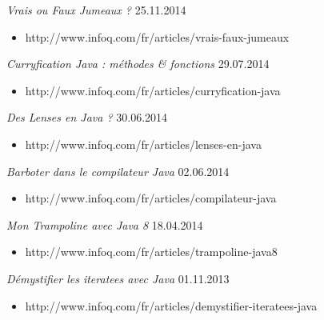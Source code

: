 \documentclass{res}
\begin{document}
\begin{resume}
{\sl Vrais ou Faux Jumeaux ?}  \hfill    25.11.2014 \\
\begin{itemize} %
 \item[] http://www.infoq.com/fr/articles/vrais-faux-jumeaux
\end{itemize}

{\sl Curryfication Java : méthodes & fonctions}  \hfill    29.07.2014 \\
\begin{itemize} %
 \item[] http://www.infoq.com/fr/articles/curryfication-java
\end{itemize}


{\sl Des Lenses en Java ?}  \hfill    30.06.2014	\\
\begin{itemize} %
 \item[] http://www.infoq.com/fr/articles/lenses-en-java
\end{itemize}

{\sl Barboter dans le compilateur Java}  \hfill    02.06.2014	\\
\begin{itemize} %
 \item[] http://www.infoq.com/fr/articles/compilateur-java
\end{itemize}

{\sl Mon Trampoline avec Java 8}  \hfill    18.04.2014	\\
\begin{itemize} %
 \item[] http://www.infoq.com/fr/articles/trampoline-java8
\end{itemize}

{\sl Démystifier les iteratees avec Java}  \hfill    01.11.2013	\\
\begin{itemize} %
 \item[] http://www.infoq.com/fr/articles/demystifier-iteratees-java
\end{itemize}


\end{resume}
\end{document}
